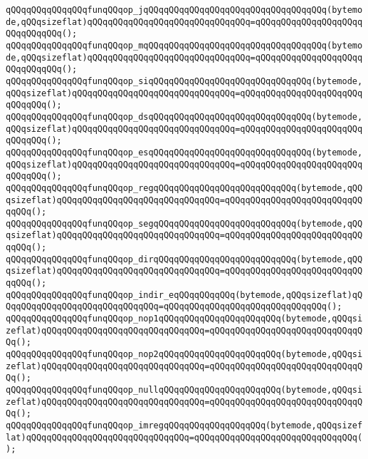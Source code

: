 \verb|qQQqqQQqqQQqqQQqfunqQQqop_jqQQqqQQqqQQqqQQqqQQqqQQqqQQqqQQqqQQq(bytemode,qQQqsizeflat)qQQqqQQqqQQqqQQqqQQqqQQqqQQqqQQq=qQQqqQQqqQQqqQQqqQQqqQQqqQQqqQQq();|\newline
\verb|qQQqqQQqqQQqqQQqfunqQQqop_mqQQqqQQqqQQqqQQqqQQqqQQqqQQqqQQqqQQq(bytemode,qQQqsizeflat)qQQqqQQqqQQqqQQqqQQqqQQqqQQqqQQq=qQQqqQQqqQQqqQQqqQQqqQQqqQQqqQQq();|\newline
\verb|qQQqqQQqqQQqqQQqfunqQQqop_siqQQqqQQqqQQqqQQqqQQqqQQqqQQqqQQq(bytemode,qQQqsizeflat)qQQqqQQqqQQqqQQqqQQqqQQqqQQqqQQq=qQQqqQQqqQQqqQQqqQQqqQQqqQQqqQQq();|\newline
\verb|qQQqqQQqqQQqqQQqfunqQQqop_dsqQQqqQQqqQQqqQQqqQQqqQQqqQQqqQQq(bytemode,qQQqsizeflat)qQQqqQQqqQQqqQQqqQQqqQQqqQQqqQQq=qQQqqQQqqQQqqQQqqQQqqQQqqQQqqQQq();|\newline
\verb|qQQqqQQqqQQqqQQqfunqQQqop_esqQQqqQQqqQQqqQQqqQQqqQQqqQQqqQQq(bytemode,qQQqsizeflat)qQQqqQQqqQQqqQQqqQQqqQQqqQQqqQQq=qQQqqQQqqQQqqQQqqQQqqQQqqQQqqQQq();|\newline
\verb|qQQqqQQqqQQqqQQqfunqQQqop_regqQQqqQQqqQQqqQQqqQQqqQQqqQQq(bytemode,qQQqsizeflat)qQQqqQQqqQQqqQQqqQQqqQQqqQQqqQQq=qQQqqQQqqQQqqQQqqQQqqQQqqQQqqQQq();|\newline
\verb|qQQqqQQqqQQqqQQqfunqQQqop_segqQQqqQQqqQQqqQQqqQQqqQQqqQQq(bytemode,qQQqsizeflat)qQQqqQQqqQQqqQQqqQQqqQQqqQQqqQQq=qQQqqQQqqQQqqQQqqQQqqQQqqQQqqQQq();|\newline
\verb|qQQqqQQqqQQqqQQqfunqQQqop_dirqQQqqQQqqQQqqQQqqQQqqQQqqQQq(bytemode,qQQqsizeflat)qQQqqQQqqQQqqQQqqQQqqQQqqQQqqQQq=qQQqqQQqqQQqqQQqqQQqqQQqqQQqqQQq();|\newline
\verb|qQQqqQQqqQQqqQQqfunqQQqop_indir_eqQQqqQQqqQQq(bytemode,qQQqsizeflat)qQQqqQQqqQQqqQQqqQQqqQQqqQQqqQQq=qQQqqQQqqQQqqQQqqQQqqQQqqQQqqQQq();|\newline
\verb|qQQqqQQqqQQqqQQqfunqQQqop_nop1qQQqqQQqqQQqqQQqqQQqqQQq(bytemode,qQQqsizeflat)qQQqqQQqqQQqqQQqqQQqqQQqqQQqqQQq=qQQqqQQqqQQqqQQqqQQqqQQqqQQqqQQq();|\newline
\verb|qQQqqQQqqQQqqQQqfunqQQqop_nop2qQQqqQQqqQQqqQQqqQQqqQQq(bytemode,qQQqsizeflat)qQQqqQQqqQQqqQQqqQQqqQQqqQQqqQQq=qQQqqQQqqQQqqQQqqQQqqQQqqQQqqQQq();|\newline
\verb|qQQqqQQqqQQqqQQqfunqQQqop_nullqQQqqQQqqQQqqQQqqQQqqQQq(bytemode,qQQqsizeflat)qQQqqQQqqQQqqQQqqQQqqQQqqQQqqQQq=qQQqqQQqqQQqqQQqqQQqqQQqqQQqqQQq();|\newline
\verb|qQQqqQQqqQQqqQQqfunqQQqop_imregqQQqqQQqqQQqqQQqqQQq(bytemode,qQQqsizeflat)qQQqqQQqqQQqqQQqqQQqqQQqqQQqqQQq=qQQqqQQqqQQqqQQqqQQqqQQqqQQqqQQq();|\newline

